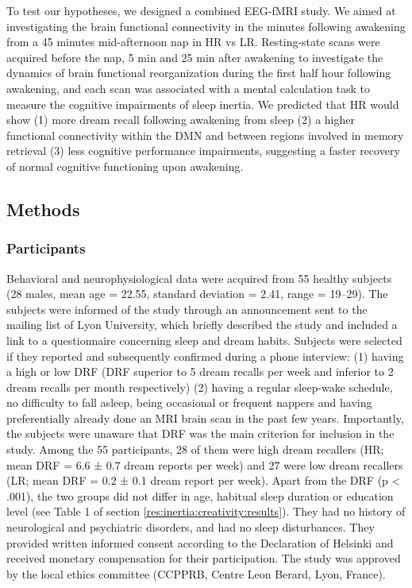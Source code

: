 To test our hypotheses, we designed a combined EEG-fMRI study. We aimed at investigating the brain functional connectivity in the minutes following awakening from a 45 minutes mid-afternoon nap in HR vs LR. Resting-state scans were acquired before the nap, 5 min and 25 min after awakening to investigate the dynamics of brain functional reorganization during the first half hour following awakening, and each scan was associated with a mental calculation task to measure the cognitive impairments of sleep inertia. We predicted that HR would show (1) more dream recall following awakening from sleep (2) a higher functional connectivity within the DMN and between regions involved in memory retrieval (3) less cognitive performance impairments, suggesting a faster recovery of normal cognitive functioning upon awakening.

\subsection*{Methods}
\label{res:inertia:drf:methods}

\subsubsection*{Participants}
Behavioral and neurophysiological data were acquired from 55 healthy subjects (28 males, mean age = 22.55, standard deviation = 2.41, range = 19–29). The subjects were informed of the study through an announcement sent to the mailing list of Lyon University, which briefly described the study and included a link to a questionnaire concerning sleep and dream habits. Subjects were selected if they reported and subsequently confirmed during a phone interview: (1) having a high or low DRF (DRF superior to 5 dream recalls per week and inferior to 2 dream recalls per month respectively) (2) having a regular sleep-wake schedule, no difficulty to fall asleep, being occasional or frequent nappers and having preferentially already done an MRI brain scan in the past few years. Importantly, the subjects were unaware that DRF was the main criterion for inclusion in the study. Among the 55 participants, 28 of them were high dream recallers (HR; mean DRF = 6.6 ± 0.7 dream reports per week) and 27 were low dream recallers (LR; mean DRF = 0.2 ± 0.1 dream report per week). Apart from the DRF (p < .001), the two groups did not differ in age, habitual sleep duration or education level (see Table 1 of section \ref{res:inertia:creativity:results}). They had no history of neurological and psychiatric disorders, and had no sleep disturbances. They provided written informed consent according to the Declaration of Helsinki and received monetary compensation for their participation. The study was approved by the local ethics committee (CCPPRB, Centre Leon Berard, Lyon, France).

